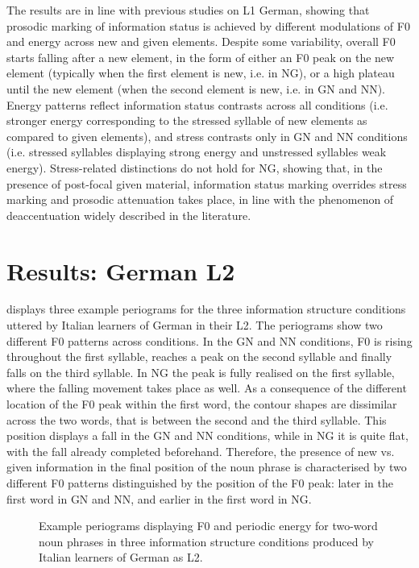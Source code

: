 The results are in line with previous studies on L1 German, showing that prosodic marking of information status is achieved by different modulations of F0 and energy across new and given elements. Despite some variability, overall F0 starts falling after a new element, in the form of either an F0 peak on the new element (typically when the first element is new, i.e. in NG), or a high plateau until the new element (when the second element is new, i.e. in GN and NN). Energy patterns reflect information status contrasts across all conditions (i.e. stronger energy corresponding to the stressed syllable of new elements as compared to given elements), and stress contrasts only in GN and NN conditions (i.e. stressed syllables displaying strong energy and unstressed syllables weak energy). Stress-related distinctions do not hold for NG, showing that, in the presence of post-focal given material, information status marking overrides stress marking and prosodic attenuation takes place, in line with the phenomenon of deaccentuation widely described in the literature.

\section{Results: German L2}
\label{sec:2.6}

 displays three example periograms for the three information structure conditions uttered by Italian learners of German in their L2. The periograms show two different F0 patterns across conditions. In the GN and NN conditions, F0 is rising throughout the first syllable, reaches a peak on the second syllable and finally falls on the third syllable. In NG the peak is fully realised on the first syllable, where the falling movement takes place as well. As a consequence of the different location of the F0 peak within the first word, the contour shapes are dissimilar across the two words, that is between the second and the third syllable. This position displays a fall in the GN and NN conditions, while in NG it is quite flat, with the fall already completed beforehand. Therefore, the presence of new vs. given information in the final position of the noun phrase is characterised by two different F0 patterns distinguished by the position of the F0 peak: later in the first word in GN and NN, and earlier in the first word in NG.


\begin{figure}



\caption{Example periograms displaying F0 and periodic energy for two-word noun phrases in three information structure conditions produced by Italian learners of German as L2.}
\label{fig:2.15}
\end{figure}

